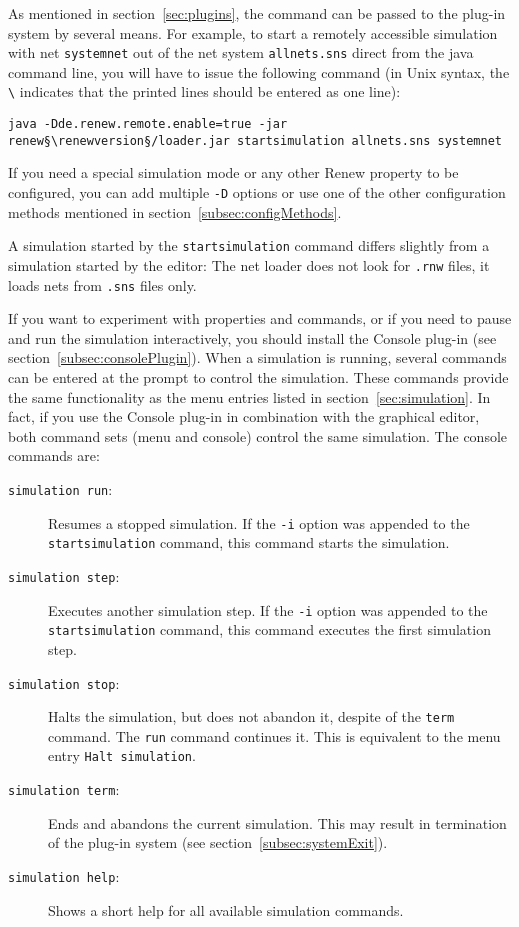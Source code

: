 As mentioned in section~\ref{sec:plugins}, the command can be passed
to the plug-in system by several means.
For example, to start a remotely accessible simulation with net
\texttt{systemnet} out of the net system \texttt{allnets.sns} direct
from the java command line, you will have to issue the following
command (in Unix syntax, the \verb:\: indicates that the printed lines
should be entered as one line):
\begin{lstlisting}[style=xnonfloating]
  java -Dde.renew.remote.enable=true -jar renew§\renewversion§/loader.jar startsimulation allnets.sns systemnet
\end{lstlisting}
If you need a special simulation mode or any other Renew property to
be configured, you can add multiple \texttt{-D} options or use one of
the other configuration methods mentioned in
section~\ref{subsec:configMethods}.

A simulation started by the \texttt{startsimulation} command
differs slightly from a simulation started by the editor:
The net loader does not look for \texttt{.rnw} files, it loads
nets from \texttt{.sns} files only.

If you want to experiment with properties and commands, or if you need
to pause and run the simulation interactively, you should install the
Console plug-in (see section~\ref{subsec:consolePlugin}).
When a simulation is running, several commands can be entered at the
prompt to control the simulation.
These commands provide the same functionality as the menu entries
listed in section~\ref{sec:simulation}.
In fact, if you use the Console plug-in in combination with the
graphical editor, both command sets (menu and console) control the
same simulation.
The console commands are:
\begin{description}
\item[\texttt{\mbox{simulation run}}:]
  Resumes a stopped simulation.
  If the \texttt{-i} option was appended to the
  \texttt{startsimulation} command, this command starts
  the simulation.
\item[\texttt{\mbox{simulation step}}:]
  Executes another simulation step. 
  If the \texttt{-i} option was appended to the
  \texttt{startsimulation} command, this command executes
  the first simulation step.
\item[\texttt{\mbox{simulation stop}}:]    
  Halts the simulation, but does not abandon it, despite of
  the \texttt{term} command. The \texttt{run} command
  continues it.
  This is equivalent to the menu entry \texttt{Halt simulation}.
\item[\texttt{\mbox{simulation term}}:]
  Ends and abandons the current simulation. 
  This may result in termination of the plug-in system
  (see section~\ref{subsec:systemExit}).
\item[\texttt{\mbox{simulation help}}:]
  Shows a short help for all available simulation commands.
\end{description}


